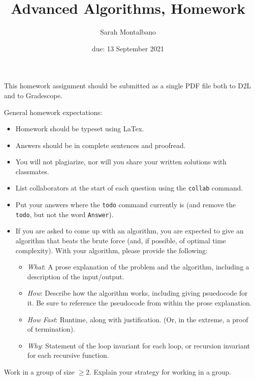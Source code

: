\documentclass{article}
\title{Advanced Algorithms, Homework \hwnum}
\author{Sarah Montalbano}
\date{due: 13 September 2021}
\begin{document}
\maketitle

This homework assignment should be
submitted as a single PDF file both to D2L and to Gradescope.

General homework expectations:
\begin{itemize}
    \item Homework should be typeset using LaTex.
    \item Answers should be in complete sentences and proofread.
    \item You will not plagiarize, nor will you share your written solutions
        with classmates.
    \item List collaborators at the start of each question using the
        \texttt{collab} command.
    \item Put your answers where the \texttt{todo} command currently is (and
        remove the \texttt{todo}, but not the word \texttt{Answer}).
    \item If you are asked to come up with an algorithm, you are
        expected to give an algorithm that beats the brute force (and, if possible, of
        optimal time complexity). With your algorithm, please provide the following:
        \begin{itemize}
            \item \emph{What}: A prose explanation of the problem and the algorithm,
                including a description of the input/output.
            \item \emph{How}: Describe how the algorithm works, including giving
                psuedocode for it.  Be sure to reference the pseudocode
                from within the prose explanation.
            \item \emph{How Fast}: Runtime, along with justification.  (Or, in the
                extreme, a proof of termination).
            \item \emph{Why}: Statement of the loop invariant for each loop, or
                recursion invariant for each recursive function.
        \end{itemize}
\end{itemize}




Work in a group of size $\geq 2$.  Explain your strategy for working in a group.
\end{document}
